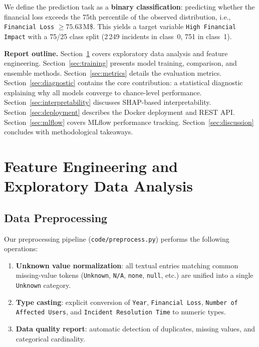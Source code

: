 \documentclass[a4paper,12pt]{article}
\begin{document}
We define the prediction task as a \textbf{binary classification}: predicting whether the financial loss exceeds the 75th percentile of the observed distribution, i.e., \texttt{Financial Loss} $\geq 75.63$\,M\$. This yields a target variable \texttt{High Financial Impact} with a 75/25 class split (2\,249 incidents in class~0, 751 in class~1).

\textbf{Report outline.} Section~\ref{sec:eda} covers exploratory data analysis and feature engineering. Section~\ref{sec:training} presents model training, comparison, and ensemble methods. Section~\ref{sec:metrics} details the evaluation metrics. Section~\ref{sec:diagnostic} contains the core contribution: a statistical diagnostic explaining why all models converge to chance-level performance. Section~\ref{sec:interpretability} discusses SHAP-based interpretability. Section~\ref{sec:deployment} describes the Docker deployment and REST API. Section~\ref{sec:mlflow} covers MLflow performance tracking. Section~\ref{sec:discussion} concludes with methodological takeaways.

\section{Feature Engineering and Exploratory Data Analysis}
\label{sec:eda}

\subsection{Data Preprocessing}

Our preprocessing pipeline (\texttt{code/preprocess.py}) performs the following operations:

\begin{enumerate}[leftmargin=2cm]
    \item \textbf{Unknown value normalization}: all textual entries matching common missing-value tokens (\texttt{Unknown}, \texttt{N/A}, \texttt{none}, \texttt{null}, etc.) are unified into a single \texttt{Unknown} category.
    \item \textbf{Type casting}: explicit conversion of \texttt{Year}, \texttt{Financial Loss}, \texttt{Number of Affected Users}, and \texttt{Incident Resolution Time} to numeric types.
    \item \textbf{Data quality report}: automatic detection of duplicates, missing values, and categorical cardinality.
\end{enumerate}
\end{document}
